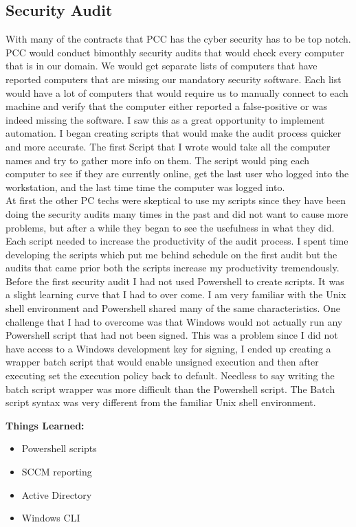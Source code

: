 \documentclass[letterpaper,10pt,notitlepage,fleqn]{article}
\begin{document}
\subsection{Security Audit}
\indent With many of the contracts that PCC has the cyber security has to be top 
notch.  PCC would conduct bimonthly security audits that would check every computer 
that is in our domain. We would get separate lists of computers that have reported 
computers that are missing our mandatory security software. Each list would have 
a lot of computers that would require us to manually connect to each machine and 
verify that the computer either reported a false-positive or was indeed missing 
the software. I saw this as a great opportunity to implement automation. I began 
creating scripts that would make the audit process quicker and more accurate. The 
first Script that I wrote would take all the computer names and try to gather more 
info on them. The script would ping each computer to see if they are currently 
online, get the last user who logged into the workstation, and the last time time 
the computer was logged into. 
\\
\indent
At first the other PC techs were skeptical to use my scripts since they have been 
doing the security audits many times in the past and did not want to cause more 
problems, but after a while they began to see the usefulness in what they did. 
Each script needed to increase the productivity of the audit process. I spent time 
developing the scripts which put me behind schedule on the first audit but the 
audits that came prior both the scripts increase my productivity tremendously.
\\
\indent Before the first security audit I had not used Powershell to create scripts.
It was a slight learning curve that I had to over come. I am very familiar with the 
Unix shell environment and Powershell shared many of the same characteristics. One 
challenge that I had to overcome was that Windows would not actually run any Powershell 
script that had not been signed. This was a problem since I did not have access to 
a Windows development key for signing, I ended up creating a wrapper batch script 
that would enable unsigned execution and then after executing set the execution 
policy back to default. Needless to say writing the batch script wrapper was more 
difficult than the Powershell script. The Batch script syntax was very different 
from the familiar Unix shell environment. 

\textbf{Things Learned:}
\begin{itemize} 
        \item Powershell scripts
        \item SCCM reporting
        \item Active Directory
        \item Windows CLI
    \end{itemize}
\end{document}
